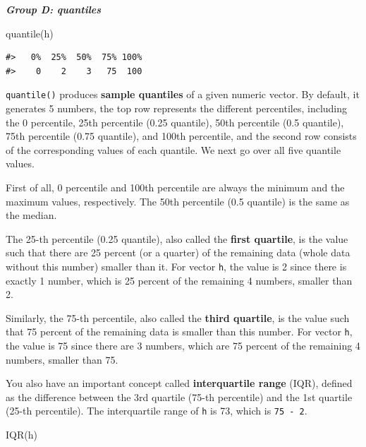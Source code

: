 \documentclass[
]{book}
\newenvironment{Shaded}{\begin{snugshade}}{\end{snugshade}}
\newcommand{\FunctionTok}[1]{\textcolor[rgb]{0.00,0.00,0.00}{#1}}
\newcommand{\NormalTok}[1]{#1}
\begin{document}
\textbf{\emph{Group D: quantiles}}

\begin{Shaded}
\begin{Highlighting}[]
\FunctionTok{quantile}\NormalTok{(h)}
\end{Highlighting}
\end{Shaded}

\begin{verbatim}
#>   0%  25%  50%  75% 100% 
#>    0    2    3   75  100
\end{verbatim}

\texttt{quantile()} produces \textbf{sample quantiles} of a given numeric vector. By default, it generates 5 numbers, the top row represents the different percentiles, including the 0 percentile, 25th percentile (0.25 quantile), 50th percentile (0.5 quantile), 75th percentile (0.75 quantile), and 100th percentile, and the second row consists of the corresponding values of each quantile. We next go over all five quantile values.

First of all, 0 percentile and 100th percentile are always the minimum and the maximum values, respectively. The 50th percentile (0.5 quantile) is the same as the median.

The 25-th percentile (0.25 quantile), also called the \textbf{first quartile}, is the value such that there are 25 percent (or a quarter) of the remaining data (whole data without this number) smaller than it. For vector \texttt{h}, the value is 2 since there is exactly 1 number, which is 25 percent of the remaining 4 numbers, smaller than 2.

Similarly, the 75-th percentile, also called the \textbf{third quartile}, is the value such that 75 percent of the remaining data is smaller than this number. For vector \texttt{h}, the value is 75 since there are 3 numbers, which are 75 percent of the remaining 4 numbers, smaller than 75.

You also have an important concept called \textbf{interquartile range} (IQR), defined as the difference between the 3rd quartile (75-th percentile) and the 1st quartile (25-th percentile). The interquartile range of \texttt{h} is 73, which is \texttt{75\ -\ 2}.

\begin{Shaded}
\begin{Highlighting}[]
\FunctionTok{IQR}\NormalTok{(h)}
\end{Highlighting}
\end{Shaded}
\end{document}
